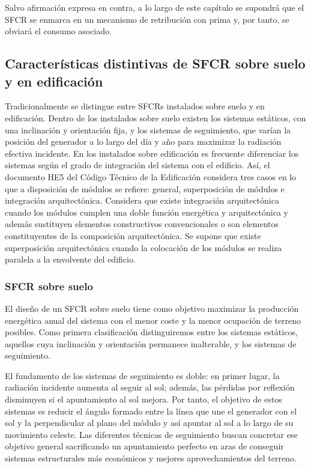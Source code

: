 Salvo afirmación expresa en contra, a lo largo de este capítulo se
supondrá que el SFCR se enmarca en un mecanismo de retribución con
prima y, por tanto, se obviará el consumo asociado.

\subsection{Características distintivas de SFCR sobre suelo y en edificación}

Tradicionalmente se distingue entre SFCRs instalados sobre suelo y
en edificación. Dentro de los instalados sobre suelo existen los sistemas
estáticos, con una inclinación y orientación fija, y los sistemas
de seguimiento, que varían la posición del generador a lo largo del
día y año para maximizar la radiación efectiva incidente. En los instalados
sobre edificación es frecuente diferenciar los sistemas según el grado
de integración del sistema con el edificio. Así, el documento HE5
del Código Técnico de la Edificación considera tres casos en lo que
a disposición de módulos se refiere: general, superposición de módulos
e integración arquitectónica. Considera que existe integración arquitectónica
cuando los módulos cumplen una doble función energética y arquitectónica
y además sustituyen elementos constructivos convencionales o son elementos
constituyentes de la composición arquitectónica. Se supone que existe
superposición arquitectónica cuando la colocación de los módulos se
realiza paralela a la envolvente del edificio.


\subsubsection{SFCR sobre suelo}

El diseño de un SFCR sobre suelo tiene como objetivo maximizar la
producción energética anual del sistema con el menor coste y la menor
ocupación de terreno posibles. Como primera clasificación distinguiremos
entre los sistemas estáticos, aquellos cuya inclinación y orientación
permanece inalterable, y los sistemas de seguimiento.

El fundamento de los sistemas de seguimiento es doble: en primer lugar,
la radiación incidente aumenta al seguir al sol; además, las pérdidas
por reflexión disminuyen si el apuntamiento al sol mejora. Por tanto,
el objetivo de estos sistemas es reducir el ángulo formado entre la
línea que une el generador con el sol y la perpendicular al plano
del módulo y así apuntar al sol a lo largo de su movimiento celeste.
Las diferentes técnicas de seguimiento buscan concretar ese objetivo
general sacrificando un apuntamiento perfecto en aras de conseguir
sistemas estructurales más económicos y mejores aprovechamientos del
terreno. 

